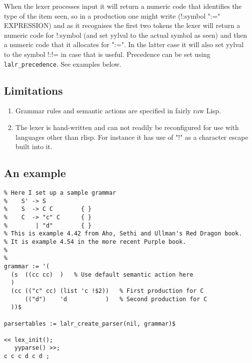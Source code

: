 When the lexer processes input it will return a numeric code that identifies
the type of the item seen, so in a production one might write
    (!:symbol ":=" EXPRESSION)
and as it recognises the first two tokens the lexer will return a numeric
code for !:symbol (and set yylval to the actual symbol as seen) and then
a numeric code that it allocates for ":=". In the latter case it will
also set yylval to the symbol !:!= in case that is useful.
%
Precedence can be set using \texttt{lalr\_precedence}. See examples below.



\subsection{Limitations}
\begin{enumerate}
\item Grammar rules and semantic actions are specified in fairly raw Lisp.
\item The lexer is hand-written and can not readily be reconfigured for
    use with languages other than rlisp. For instance it has use of "!"
    as a character escape built into it.
\end{enumerate}


\subsection{An example}
\begin{verbatim}
% Here I set up a sample grammar
%    S' -> S
%    S  -> C C        { }
%    C  -> "c" C      { }
%        | "d"        { }
% This is example 4.42 from Aho, Sethi and Ullman's Red Dragon book.
% It is example 4.54 in the more recent Purple book.
%
%
grammar := '(
  (s  ((cc cc)  )   % Use default semantic action here
  )
  (cc (("c" cc) (list 'c !$2))   % First production for C
      (("d")    'd           )   % Second production for C
  ))$

parsertables := lalr_create_parser(nil, grammar)$

<< lex_init();
   yyparse() >>;
c c c d c d ;
\end{verbatim}

\endinput


A grammar is given as a list of rules. Each rule has a single non-terminal
and then a seqence of productions for it. Each production can optionally
be provided with an associated semantic action.

